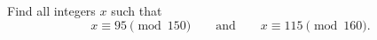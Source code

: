 Find all integers $x$ such that
\[
x\equiv95\pmod{150}\qquad\text{and}\qquad x\equiv115\pmod{160}.
\]

